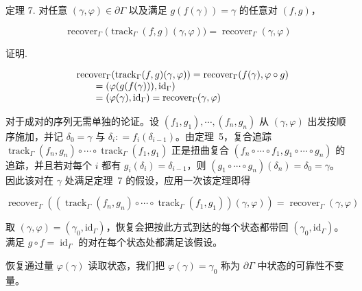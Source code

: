 定理 7. 对任意 \(( \gamma , \varphi ) \in \partial \Gamma\) 以及满足
\(g ( f ( \gamma ) ) = \gamma\) 的任意对 \(( f , g )\)，

\[
\operatorname { r e c o v e r } _ { \Gamma } \bigl ( \operatorname { t r a c k } _ { \Gamma } ( f , g ) ( \gamma , \varphi ) \bigr ) = \operatorname { r e c o v e r } _ { \Gamma } ( \gamma , \varphi )\tag{10}
\]

证明.

\[
\begin{array} { r l }
  & \operatorname { r e c o v e r } _ { \Gamma } ( \operatorname { t r a c k } _ { \Gamma } ( f , g ) ( \gamma , \varphi ) ) = \operatorname { r e c o v e r } _ { \Gamma } ( f ( \gamma ) , \varphi \circ g ) \\
  & \qquad = ( \varphi ( g ( f ( \gamma ) ) ) , \mathrm { i d } _ { \Gamma } ) \\
  & \qquad = ( \varphi ( \gamma ) , \mathrm { i d } _ { \Gamma } ) = \operatorname { r e c o v e r } _ { \Gamma } ( \gamma , \varphi )
\end{array}
\]

对于成对的序列无需单独的论证。设 \(( f _ { 1 } , g _ { 1 } ) , \cdots , ( f _ { n } , g _ { n } )\) 从
\(( \gamma , \varphi )\) 出发按顺序施加，并记 \(\delta _ { 0 } = \gamma\) 与
\(\delta _ { i } : = f _ { i } ( \delta _ { i - 1 } )\)。由定理~5，复合追踪
\(\operatorname { t r a c k } _ { \Gamma } ( f _ { n } , g _ { n } ) \circ \cdots \circ \operatorname { t r a c k } _ { \Gamma } ( f _ { 1 } , g _ { 1 } )\)
正是扭曲复合
\(( f _ { n } \circ \cdots \circ f _ { 1 } , g _ { 1 } \circ \cdots \circ g _ { n } )\)
的追踪，并且若对每个 \(i\) 都有 \(g _ { i } ( \delta _ { i } ) = \delta _ { i - 1 }\)，则
\(( g _ { 1 } \circ \cdots \circ g _ { n } ) ( \delta _ { n } ) = \delta _ { 0 } = \gamma\)。
因此该对在 \(\gamma\) 处满足定理~7 的假设，应用一次该定理即得

\[
\operatorname { r e c o v e r } _ { \Gamma } ( ( \operatorname { t r a c k } _ { \Gamma } ( f _ { n } , g _ { n } ) \circ \dotsb \circ \operatorname { t r a c k } _ { \Gamma } ( f _ { 1 } , g _ { 1 } ) ) ( \gamma , \varphi ) ) = \operatorname { r e c o v e r } _ { \Gamma } ( \gamma , \varphi )\tag{11}
\]

取 \(( \gamma , \varphi ) = ( \gamma _ { 0 } , \mathrm { i d } _ { \Gamma } )\)，恢复会把按此方式到达的每个状态都带回
\(( \gamma _ { 0 } , \mathrm { i d } _ { \Gamma } )\)。满足 \(g \circ f = \operatorname { i d } _ { \Gamma }\) 的对在每个状态处都满足该假设。

恢复通过量 \(\varphi ( \gamma )\) 读取状态，我们把 \(\varphi ( \gamma ) = \gamma _ { 0 }\) 称为 \(\partial \Gamma\) 中状态的可靠性不变量。

